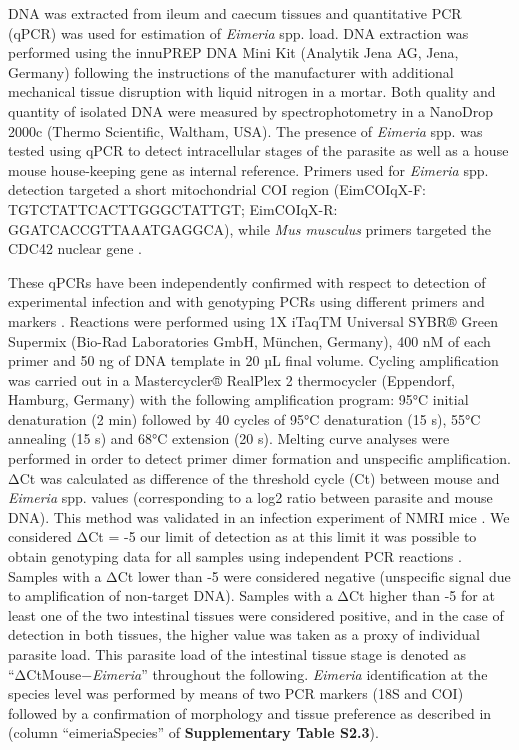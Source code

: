 \par 
DNA was extracted from ileum and caecum tissues and quantitative PCR (qPCR) was used for estimation of \textit{Eimeria} spp. load. DNA extraction was performed using the innuPREP DNA Mini Kit (Analytik Jena AG, Jena, Germany) following the instructions of the manufacturer with additional mechanical tissue disruption with liquid nitrogen in a mortar. Both quality and quantity of isolated DNA were measured by spectrophotometry in a NanoDrop 2000c (Thermo Scientific, Waltham, USA). The presence of \textit{Eimeria} spp. was tested using qPCR to detect intracellular stages of the parasite as well as a house mouse house-keeping gene as internal reference. Primers used for \textit{Eimeria} spp. detection targeted a short mitochondrial COI region (Eim\textunderscore COI\textunderscore qX-F:  TGTCTATTCACTTGGGCTATTGT; Eim\textunderscore COI\textunderscore qX-R: GGATCACCGTTAAATGAGGCA), while \textit{Mus musculus} primers targeted the CDC42 nuclear gene \parencite[Ms\textunderscore gDNA\textunderscore CDC42\textunderscore F: CTCTCCTCCCCTCTGTCTTG; Ms\textunderscore gDNA\textunderscore CDC42\textunderscore R: TCCTTTTGGGTTGAGTTTCC; ][]{al-khlifeh_eimeria_2019, jarquin-diaz_detection_2019}.
\par These qPCRs have been independently confirmed with respect to detection of experimental infection \citep{al-khlifeh_eimeria_2019} and with genotyping PCRs using different primers and markers \citep{jarquin-diaz_detection_2019}. Reactions were performed using 1X iTaqTM Universal SYBR® Green Supermix (Bio-Rad Laboratories GmbH, München, Germany), 400 nM of each primer and 50 ng of DNA template in 20 µL final volume. Cycling amplification was carried out in a Mastercycler® RealPlex 2 thermocycler (Eppendorf, Hamburg, Germany) with the following amplification program: 95°C initial denaturation (2 min) followed by 40 cycles of 95°C denaturation (15 s), 55°C annealing (15 s) and 68°C extension (20 s). Melting curve analyses were performed in order to detect primer dimer formation and unspecific amplification. ΔCt was calculated as difference of the threshold cycle (Ct) between mouse and \textit{Eimeria} spp. values (corresponding to a log2 ratio between parasite and mouse DNA). This method was validated in an infection experiment of NMRI mice \citep{al-khlifeh_eimeria_2019}. We considered ΔCt = -5 our limit of detection as at this limit it was possible to obtain genotyping data for all samples using independent PCR reactions \citep{ahmed_novel_2019, jarquin-diaz_detection_2019}. Samples with a ΔCt lower than -5 were considered negative (unspecific signal due to amplification of non-target DNA). Samples with a ΔCt higher than -5 for at least one of the two intestinal tissues were considered positive, and in the case of detection in both tissues, the higher value was taken as a proxy of individual parasite load. This parasite load of the intestinal tissue stage is denoted as “ΔCtMouse−\textit{Eimeria}” throughout the following. \textit{Eimeria} identification at the species level was performed by means of two PCR markers (18S and COI) followed by a confirmation of morphology and tissue preference as described in \cite{jarquin-diaz_detection_2019} (column “eimeriaSpecies” of \textbf{Supplementary Table S2.3}).

